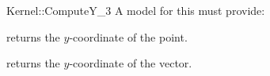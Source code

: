 \begin{ccRefFunctionObjectConcept}{Kernel::ComputeY_3}
A model for this must provide:


       {returns the $y$-coordinate of the point.}

       {returns the $y$-coordinate of the vector.}

\ccRefines
{}



\end{ccRefFunctionObjectConcept}
